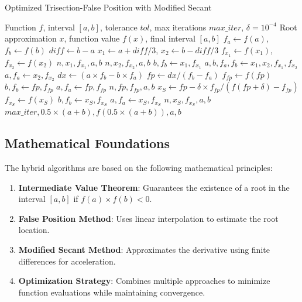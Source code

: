 \documentclass[11pt,a4paper]{article}
\begin{document}
\begin{algorithm}[H]
\caption{Optimized Trisection-False Position with Modified Secant}
\begin{algorithmic}[1]
\REQUIRE Function $f$, interval $[a,b]$, tolerance $tol$, max iterations $max\_iter$, $\delta = 10^{-4}$
\ENSURE Root approximation $x$, function value $f(x)$, final interval $[a,b]$
\STATE $f_a \leftarrow f(a)$, $f_b \leftarrow f(b)$
    \STATE $diff \leftarrow b - a$
    \STATE $x_1 \leftarrow a + diff/3$, $x_2 \leftarrow b - diff/3$
    \STATE $f_{x_1} \leftarrow f(x_1)$, $f_{x_2} \leftarrow f(x_2)$
        \RETURN $n, x_1, f_{x_1}, a, b$
    \ENDIF
        \RETURN $n, x_2, f_{x_2}, a, b$
    \ENDIF
        \STATE $b, f_b \leftarrow x_1, f_{x_1}$
        \STATE $a, b, f_a, f_b \leftarrow x_1, x_2, f_{x_1}, f_{x_2}$
    \ELSE
        \STATE $a, f_a \leftarrow x_2, f_{x_2}$
    \ENDIF
    \STATE $dx \leftarrow (a \times f_b - b \times f_a)$
    \STATE $fp \leftarrow dx / (f_b - f_a)$
    \STATE $f_{fp} \leftarrow f(fp)$
        \STATE $b, f_b \leftarrow fp, f_{fp}$
    \ELSE
        \STATE $a, f_a \leftarrow fp, f_{fp}$
    \ENDIF
        \RETURN $n, fp, f_{fp}, a, b$
    \ENDIF
    \STATE $x_S \leftarrow fp - \delta \times f_{fp} / (f(fp + \delta) - f_{fp})$
        \STATE $f_{x_S} \leftarrow f(x_S)$
                \STATE $b, f_b \leftarrow x_S, f_{x_S}$
            \ELSE
                \STATE $a, f_a \leftarrow x_S, f_{x_S}$
            \ENDIF
                \RETURN $n, x_S, f_{x_S}, a, b$
            \ENDIF
        \ENDIF
    \ENDIF
\ENDFOR
\RETURN $max\_iter, 0.5 \times (a + b), f(0.5 \times (a + b)), a, b$
\end{algorithmic}
\end{algorithm}

\subsection{Mathematical Foundations}

The hybrid algorithms are based on the following mathematical principles:

\begin{enumerate}
    \item \textbf{Intermediate Value Theorem}: Guarantees the existence of a root in the interval $[a,b]$ if $f(a) \times f(b) < 0$.
    \item \textbf{False Position Method}: Uses linear interpolation to estimate the root location.
    \item \textbf{Modified Secant Method}: Approximates the derivative using finite differences for acceleration.
    \item \textbf{Optimization Strategy}: Combines multiple approaches to minimize function evaluations while maintaining convergence.
\end{enumerate}
\end{document}
